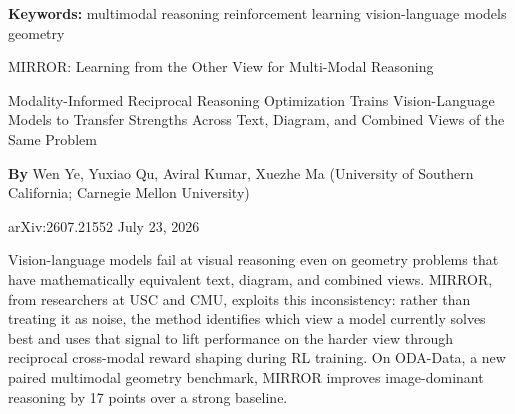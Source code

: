 \documentclass[10pt,twocolumn]{article}
\begin{document}
\setlength{\parindent}{0pt}
\setlength{\parskip}{4pt}

{\small\color{keywordgray}\textbf{Keywords:}
  multimodal reasoning \textbullet{}
  reinforcement learning \textbullet{}
  vision-language models \textbullet{}
  geometry}\par\vspace{4pt}

{\LARGE\bfseries\raggedright
  MIRROR: Learning from the Other View
  for Multi-Modal Reasoning}\par\vspace{4pt}

{\large\itshape\raggedright
  Modality-Informed Reciprocal Reasoning Optimization Trains
  Vision-Language Models to Transfer Strengths Across
  Text, Diagram, and Combined Views of the Same Problem}\par\vspace{6pt}

{\small\textbf{By} Wen Ye, Yuxiao Qu, Aviral Kumar, Xuezhe Ma
  (University of Southern California; Carnegie Mellon University)}\par\vspace{2pt}

{\small\color{keywordgray}arXiv:2607.21552 \textbullet{} July 23, 2026}
\par\vspace{2pt}\noindent{\color{rulered}\rule{\columnwidth}{0.6pt}}\vspace{6pt}

Vision-language models fail at visual reasoning even on geometry problems
that have mathematically equivalent text, diagram, and combined views.
MIRROR, from researchers at USC and CMU, exploits this inconsistency:
rather than treating it as noise, the method identifies which view a model
currently solves best and uses that signal to lift performance on the
harder view through reciprocal cross-modal reward shaping during RL
training. On ODA-Data, a new paired multimodal geometry benchmark, MIRROR
improves image-dominant reasoning by 17 points over a strong baseline.
\end{document}
